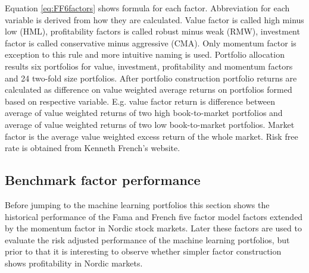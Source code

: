 \documentclass{article}
\begin{document}
Equation \ref{eq:FF6factors} shows formula for each factor. Abbreviation for each variable is derived from how they are calculated. Value factor is called high minus low (HML), profitability factors is called robust minus weak (RMW), investment factor is called conservative minus aggressive (CMA). Only momentum factor is exception to this rule and more intuitive naming is used. Portfolio allocation results six portfolios for value, investment, profitability and momentum factors and 24 two-fold size portfolios. After portfolio construction portfolio returns are calculated as difference on value weighted average returns on portfolios formed based on respective variable. E.g. value factor return is difference between average of value weighted returns of two high book-to-market portfolios and average of value weighted returns of two low book-to-market portfolios. Market factor is the average value weighted excess return of the whole market. Risk free rate is obtained from Kenneth French's website. \par

\subsection{Benchmark factor performance}\label{BenchmarkFactorPerformance}

Before jumping to the machine learning portfolios this section shows the historical performance of the Fama and French five factor \citeyear{FAMA20151} model factors extended by the momentum factor in Nordic stock markets. Later these factors are used to evaluate the risk adjusted performance of the machine learning portfolios, but prior to that it is interesting to observe whether simpler factor construction shows profitability in Nordic markets. \par
\end{document}
